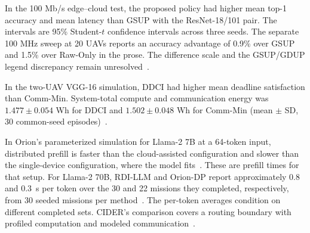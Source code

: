 \documentclass[pdflatex,sn-vancouver-num]{sn-jnl}
\begin{document}
In the 100 Mb/s edge--cloud test, the proposed policy had higher mean top-1 accuracy and mean latency than GSUP with the ResNet-18/101 pair. The intervals are 95\% Student-$t$ confidence intervals across three seeds. The separate 100 MHz sweep at 20 UAVs reports an accuracy advantage of 0.9\% over GSUP and 1.5\% over Raw-Only in the prose. The difference scale and the GSUP/GDUP legend discrepancy remain unresolved~\cite{R0080}.\par In the two-UAV VGG-16 simulation, DDCI had higher mean deadline satisfaction than Comm-Min. System-total compute and communication energy was $1.477\pm0.054$ Wh for DDCI and $1.502\pm0.048$ Wh for Comm-Min (mean $\pm$ SD, 30 common-seed episodes)~\cite{R0092}.

In Orion's parameterized simulation for Llama-2 7B at a 64-token input, distributed prefill is faster than the cloud-assisted configuration and slower than the single-device configuration, where the model fits~\cite{R0074}. These are prefill times for that setup. For Llama-2 70B, RDI-LLM and Orion-DP report approximately 0.8 and 0.3~s per token over the 30 and 22 missions they completed, respectively, from 30 seeded missions per method~\cite{R0110}. The per-token averages condition on different completed sets. CIDER's comparison covers a routing boundary with profiled computation and modeled communication~\cite{R0075}.
\end{document}
